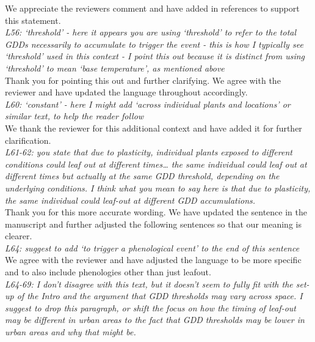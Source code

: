 \documentclass[11pt,a4paper]{article}\usepackage[]{graphicx}\usepackage[]{color}
\begin{document}
We appreciate the reviewers comment and have added in references to support this statement. \\

\textit{L56: `threshold' - here it appears you are using `threshold' to refer to the total GDDs necessarily to accumulate to trigger the event - this is how I typically see `threshold' used in this context - I point this out because it is distinct from using `threshold' to mean `base temperature', as mentioned above} \\

Thank you for pointing this out and further clarifying. We agree with the reviewer and have updated the language throughout accordingly. \\

\textit{L60: `constant' - here I might add `across individual plants and locations' or similar text, to help the reader follow} \\

We thank the reviewer for this additional context and have added it for further clarification. \\

\textit{L61-62: you state that due to plasticity, individual plants exposed to different conditions could leaf out at different times… the same individual could leaf out at different times but actually at the same GDD threshold, depending on the underlying conditions. I think what you mean to say here is that due to plasticity, the same individual could leaf-out at different GDD accumulations.} \\

Thank you for this more accurate wording. We have updated the sentence in the manuscript and further adjusted the following sentences so that our meaning is clearer. \\

\textit{L64: suggest to add `to trigger a phenological event' to the end of this sentence} \\

We agree with the reviewer and have adjusted the language to be more specific and to also include phenologies other than just leafout. \\

\textit{L64-69: I don't disagree with this text, but it doesn't seem to fully fit with the set-up of the Intro and the argument that GDD thresholds may vary across space. I suggest to drop this paragraph, or shift the focus on how the timing of leaf-out may be different in urban areas to the fact that GDD thresholds may be lower in urban areas and why that might be.} \\
\end{document}
